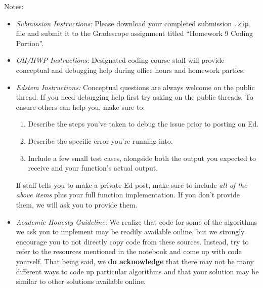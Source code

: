 \documentclass[11pt]{article}
\begin{document}
\noindent Notes:
\begin{itemize}
    \item \textit{Submission Instructions:} Please download your completed submission \texttt{.zip} file and submit it to the Gradescope assignment titled ``Homework 9 Coding Portion''. 
        
    \item \textit{OH/HWP Instructions:} Designated coding course staff will provide conceptual and debugging help during office hours and homework parties.

    \item \textit{Edstem Instructions:} Conceptual questions are always welcome on the public thread. If you need debugging help first try asking on the public threads. To ensure others can help you, make sure to:
        \begin{enumerate}
            \item Describe the steps you've taken to debug the issue prior to posting on Ed.
            \item Describe the specific error you're running into.
            \item Include a few small test cases, alongside both the output you expected to receive and your function's actual output. 
        \end{enumerate}
    If staff tells you to make a private Ed post, make sure to include \textit{all of the above items} plus your full function implementation. If you don't provide them, we will ask you to provide them.
    
    \item \textit{Academic Honesty Guideline:} We realize that code for some of the algorithms we ask you to implement may be readily available online, but we strongly encourage you to not directly copy code from these sources. Instead, try to refer to the resources mentioned in the notebook and come up with code yourself. That being said, we \textbf{do acknowledge} that there may not be many different ways to code up particular algorithms and that your solution may be similar to other solutions available online.
    
\end{itemize}
\end{document}
